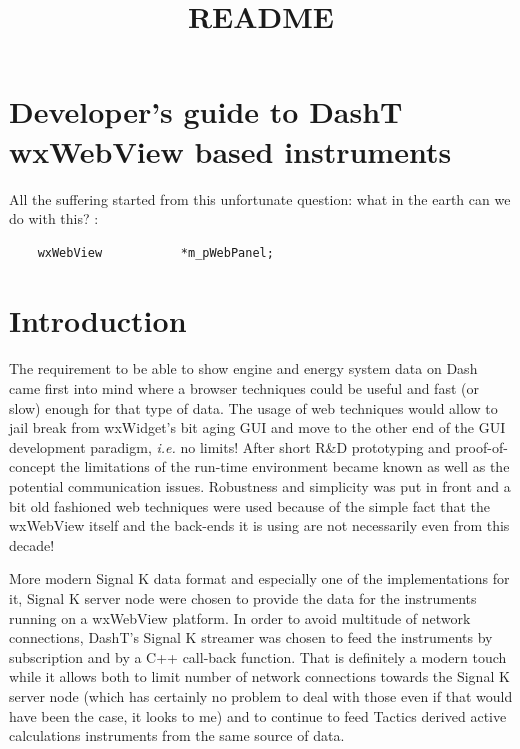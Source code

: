 \documentclass[11pt]{article}
\title{README}
\begin{document}
    
    \maketitle
    
    

    
    \hypertarget{developers-guide-to-dasht-wxwebview-based-instruments}{%
\section{Developer's guide to DashT wxWebView based
instruments}\label{developers-guide-to-dasht-wxwebview-based-instruments}}

    All the suffering started from this unfortunate question: what in the
earth can we do with this? :

\begin{verbatim}
    wxWebView           *m_pWebPanel;
\end{verbatim}

    \hypertarget{introduction}{%
\section{Introduction}\label{introduction}}

    The requirement to be able to show engine and energy system data on Dash
came first into mind where a browser techniques could be useful and fast
(or slow) enough for that type of data. The usage of web techniques
would allow to jail break from wxWidget's bit aging GUI and move to the
other end of the GUI development paradigm, \emph{i.e.} no limits! After
short R\&D prototyping and proof-of-concept the limitations of the
run-time environment became known as well as the potential communication
issues. Robustness and simplicity was put in front and a bit old
fashioned web techniques were used because of the simple fact that the
wxWebView itself and the back-ends it is using are not necessarily even
from this decade!

    More modern Signal K data format and especially one of the
implementations for it, Signal K server node were chosen to provide the
data for the instruments running on a wxWebView platform. In order to
avoid multitude of network connections, DashT's Signal K streamer was
chosen to feed the instruments by subscription and by a C++ call-back
function. That is definitely a modern touch while it allows both to
limit number of network connections towards the Signal K server node
(which has certainly no problem to deal with those even if that would
have been the case, it looks to me) and to continue to feed Tactics
derived active calculations instruments from the same source of data.
\end{document}

